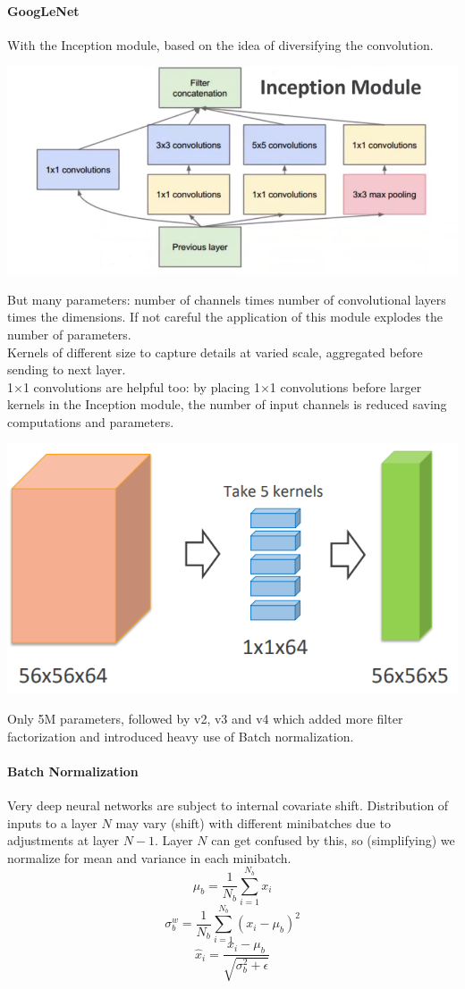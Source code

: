 \documentclass[10pt]{report}
\begin{document}
\paragraph{GoogLeNet} With the Inception module, based on the idea of diversifying the convolution.
\begin{center}
	\includegraphics[scale=0.5]{64.png}
\end{center}
But many parameters: number of channels times number of convolutional layers times the dimensions. If not careful the application of this module explodes the number of parameters.\\
Kernels of different size to capture details at varied scale, aggregated before sending to next layer.\\
1$\times$1 convolutions are helpful too: by placing 1$\times$1 convolutions before larger kernels in the Inception module, the number of input channels is reduced saving computations and parameters.\begin{center}
	\includegraphics[scale=0.5]{65.png}
\end{center}
Only 5M parameters, followed by v2, v3 and v4 which added more filter factorization and introduced heavy use of Batch normalization.
\paragraph{Batch Normalization} Very deep neural networks are subject to internal covariate shift. Distribution of inputs to a layer $N$ may vary (shift) with different minibatches due to adjustments at layer $N-1$. Layer $N$ can get confused by this, so (simplifying) we normalize for mean and variance in each minibatch.
$$\mu_b=\frac{1}{N_b}\sum_{i=1}^{N_b}x_i$$
$$\sigma_b^w=\frac{1}{N_b} \sum_{i=1}^{N_b}(x_i-\mu_b)^2$$
$$\hat{x}_i = \frac{x_i-\mu_b}{\sqrt{\sigma^2_b+\epsilon}}$$
\end{document}

